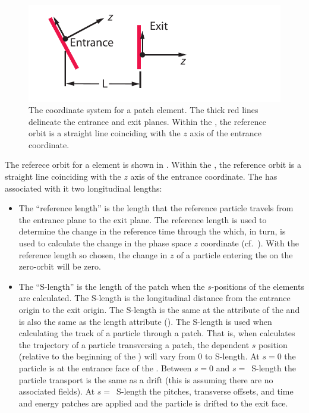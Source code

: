 
\begin{figure}[!b]
  \centering
  \includegraphics[width=5in]{patch-coords.pdf}
  \caption[The coordinate system for a patch element.]
{The coordinate system for a patch element. The thick red lines
delineate the entrance and exit planes. Within the , the reference
orbit is a straight line coinciding with the $z$ axis of the entrance coordinate.}
  \label{f:patch.coords}
\end{figure}

The referece orbit for a  element is shown in
.  Within the , the reference orbit is
a straight line coinciding with the $z$ axis of the entrance
coordinate. The  has associated with it two longitudinal
lengths: 
\begin{itemize}
\item
The ``reference length'' is the length that the reference particle
travels from the entrance plane to the exit plane. The reference
length is used to determine the change in the reference time through
the  which, in turn, is used to calculate the change in the
phase space $z$ coordinate (cf.~). With the reference length
so chosen, the change in $z$ of a particle entering the  on
the zero-orbit will be zero.
\item
The ``S-length'' is the length of the patch when the $s$-positions of
the elements are calculated. The S-length is the longitudinal distance
from the entrance origin to the exit origin. The S-length is the same
at the  attribute of the  and is also the same
as the  length attribute (). The S-length is used when
calculating the track of a particle through a patch. That is, when
\bmad calculates the trajectory of a particle transversing a patch,
the dependent $s$ position (relative to the beginning of the
) will vary from 0 to S-length. At $s = 0$ the particle is
at the entrance face of the . Between $s = 0$ and $s
=$~S-length the particle transport is the same as a drift (this is
assuming there are no associated fields). At $s =$~S-length the
pitches, transverse offsets, and time and energy patches are applied
and the particle is drifted to the exit face.
\end{itemize}

